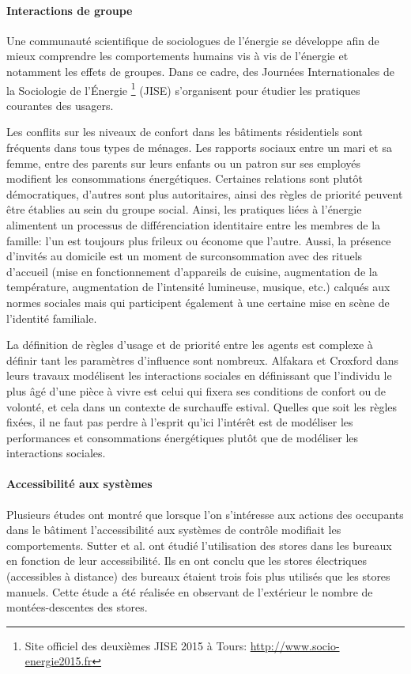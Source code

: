 \paragraph{Interactions de groupe}

Une communauté scientifique de sociologues de l'énergie se développe afin de mieux comprendre les comportements humains vis à vis de l'énergie et notamment les effets de groupes. Dans ce cadre, des Journées Internationales de la Sociologie de l'Énergie \footnote{Site officiel des deuxièmes JISE 2015 à Tours: \url{http://www.socio-energie2015.fr}} (JISE) s'organisent pour étudier les pratiques courantes des usagers.

Les conflits sur les niveaux de confort dans les bâtiments résidentiels sont fréquents dans tous types de ménages. Les rapports sociaux entre un mari et sa femme, entre des parents sur leurs enfants ou un patron sur ses employés modifient les consommations énergétiques. Certaines relations sont plutôt démocratiques, d'autres sont plus autoritaires, ainsi des règles de priorité peuvent être établies au sein du groupe social. Ainsi, les pratiques liées à l'énergie alimentent un processus de différenciation identitaire entre les membres de la famille: l'un est toujours plus frileux ou économe que l'autre. Aussi, la présence d'invités au domicile est un moment de surconsommation avec des rituels d'accueil (mise en fonctionnement d'appareils de cuisine, augmentation de la température, augmentation de l'intensité lumineuse, musique, etc.) calqués aux normes sociales mais qui participent également à une certaine mise en scène de l'identité familiale.

La définition de règles d'usage et de priorité entre les agents est complexe à définir tant les paramètres d'influence sont nombreux. Alfakara et Croxford \cite{Alfakara-14} dans leurs travaux modélisent les interactions sociales en définissant que l'individu le plus âgé d'une pièce à vivre est celui qui fixera ses conditions de confort ou de volonté, et cela dans un contexte de surchauffe estival. Quelles que soit les règles fixées, il ne faut pas perdre à l'esprit qu'ici l'intérêt est de modéliser les performances et consommations énergétiques plutôt que de modéliser les interactions sociales.

\paragraph{Accessibilité aux systèmes}

Plusieurs études ont montré que lorsque l'on s'intéresse aux actions des occupants dans le bâtiment l'accessibilité aux systèmes de contrôle modifiait les comportements. Sutter et al. \cite{Sutter-06} ont étudié l'utilisation des stores dans les bureaux en fonction de leur accessibilité. Ils en ont conclu que les stores électriques (accessibles à distance) des bureaux étaient trois fois plus utilisés que les stores manuels. Cette étude a été réalisée en observant de l'extérieur le nombre de montées-descentes des stores. 

